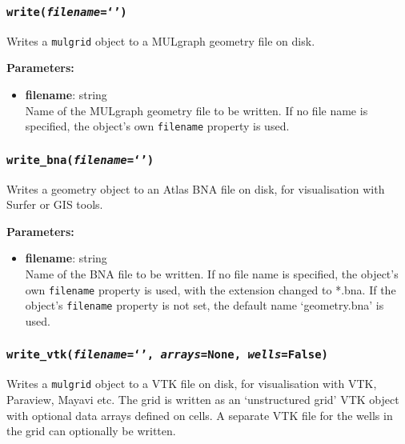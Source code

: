 \subsubsection{\texttt{write(\emph{filename}=`')}}

Writes a \texttt{mulgrid} object to a MULgraph geometry file on disk.

\textbf{Parameters:}
\begin{itemize}
\item \textbf{filename}: string\\
  Name of the MULgraph geometry file to be written.  If no file name is specified, the object's own \texttt{filename} property is used.
\end{itemize}

\subsubsection{\texttt{write\_bna(\emph{filename}=`')}}

Writes a geometry object to an Atlas BNA file on disk, for visualisation with Surfer or GIS tools.

\textbf{Parameters:}
\begin{itemize}
\item \textbf{filename}: string\\
  Name of the BNA file to be written.  If no file name is specified, the object's own \texttt{filename} property is used, with the extension changed to *.bna.  If the object's \texttt{filename} property is not set, the default name `geometry.bna' is used.
\end{itemize}

\subsubsection{\texttt{write\_vtk(\emph{filename}=`', \emph{arrays}=None, \emph{wells}=False)}}

Writes a \texttt{mulgrid} object to a VTK file on disk, for visualisation with VTK, Paraview, Mayavi etc.  The grid is written as an `unstructured grid' VTK object with optional data arrays defined on cells.  A separate VTK file for the wells in the grid can optionally be written.

